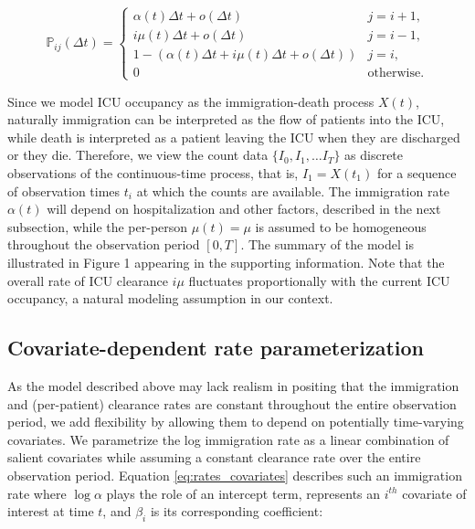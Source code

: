 \documentclass{article}
\newcommand{\achal}[1]{{\color{black}{ #1}}}
\begin{document}
\begin{equation}
    \mathbb{P}_{ij}(\Delta t)=%
    \begin{cases} 
      \alpha(t)\Delta t + o(\Delta t) & j=i+1, \\
      i\mu(t) \Delta t +  o(\Delta t) & j=i-1, \\
      1 - (\alpha(t)\Delta t + i\mu(t) \Delta t + o(\Delta t)) & j=i, \\
      0 & \text{otherwise}.
   \end{cases}
   \label{eq:transprob}
\end{equation}

Since we model ICU occupancy as the immigration-death process $X(t)$, naturally immigration can be interpreted as the flow of patients into the ICU, while death is interpreted as a patient leaving the ICU when they are discharged or they die.\achal{However, in order to disambiguate the term ``death'' for our application to the problem of ICU stay, we refer to the ``death'' rate of a stochastic immigration-death model as ``clearance'' rate throughout this paper.} Therefore, we view the count data $\{ I_0, I_1, \ldots I_T \}$ as discrete observations of the continuous-time process, that is, $I_1 = X(t_1)$ for a sequence of observation times $t_i$ at which the counts are available. The immigration rate $\alpha(t)$ will depend on hospitalization and other factors, described in the next subsection, while the per-person\achal{clearance rate} $\mu(t) = \mu$ is assumed to be homogeneous throughout the observation period $[0,T]$. The summary of the model is illustrated in Figure 1 appearing in the supporting information. Note that the overall rate of ICU clearance $i \mu$ fluctuates proportionally with the current ICU occupancy, a natural modeling assumption in our context.

\subsection{Covariate-dependent rate parameterization}
\label{Covariate-dependent rate parameterization}

As the model described above may lack realism in positing that the immigration and (per-patient) clearance rates are constant throughout the entire observation period, we add flexibility by allowing them to depend on potentially time-varying covariates. We parametrize the log immigration rate as a linear combination of salient covariates while assuming a constant clearance rate over the entire observation period. Equation \ref{eq:rates_covariates} describes such an immigration rate where $\log\alpha$ plays the role of an intercept term,\achal{$\psi_{i}(t)$} represents an $i^{th}$ covariate of interest at time $t$, and $\beta_{i}$ is its corresponding coefficient: 
\end{document}
